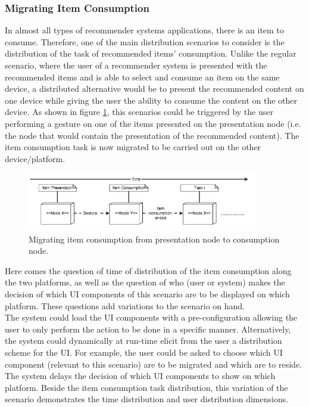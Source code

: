 \subsubsection{Migrating Item Consumption}                    
In almost all types of recommender systems applications, there is an item to consume. Therefore, one of the main distribution scenarios to consider is the distribution of the task of recommended items' consumption. Unlike the regular scenario, where the user of a recommender system is presented with the recommended items and is able to select and consume an item on the same device, a distributed alternative would be to present the recommended content on one device while giving the user the ability to consume the content on the other device. As shown in figure \ref{fig:figure31}, this scenarios could be triggered by the user performing a gesture on one of the items presented on the presentation node (i.e. the node that would contain the presentation of the recommended content). The item consumption task is now migrated to be carried out on the other device/platform. 
\begin{figure}[h]
\includegraphics[width=0.9\textwidth, center, center]{figures/generic1}
\caption{Migrating item consumption from presentation node to consumption node.}
\label{fig:figure31}
\end{figure}
Here comes the question of time of distribution of the item consumption along the two platforms, as well as the question of who (user or system) makes the decision of which UI components of this scenario are to be displayed on which platform. These questions add variations to the scenario on hand.\\
The system could load the UI components with a pre-configuration allowing the user to only perform the action to be done in a specific manner. Alternatively, the system could dynamically at run-time elicit from the user a distribution scheme for the UI. For example, the user could be asked to choose which UI component (relevant to this scenario) are to be migrated and which are to reside. The system delays the decision of which UI components to show on which platform. Beside the item consumption task distribution, this variation of the scenario demonstrates the time distribution and user distribution dimensions.
      
